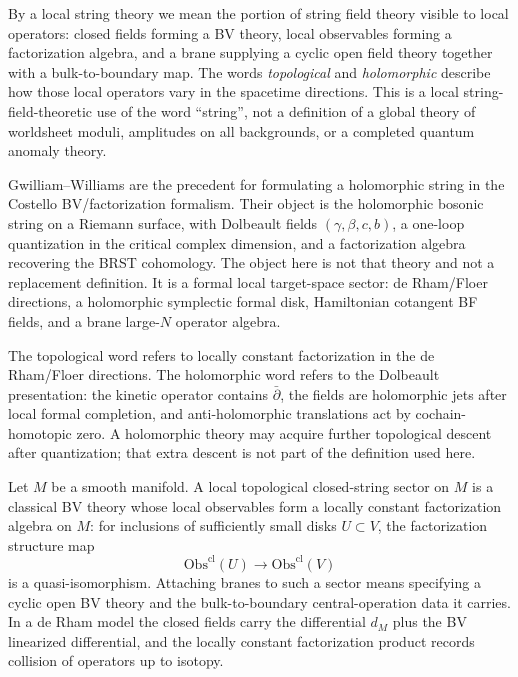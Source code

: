\documentclass[11pt]{memoir}
\begin{document}
By a local string theory we mean the portion of string field theory
visible to local operators: closed fields forming a BV theory, local
observables forming a factorization algebra, and a brane supplying a
cyclic open field theory together with a bulk-to-boundary map. The
words \emph{topological} and \emph{holomorphic} describe how those
local operators vary in the spacetime directions. This is a
local string-field-theoretic use of the word ``string'', not a
definition of a global theory of worldsheet moduli, amplitudes on
all backgrounds, or a completed quantum anomaly theory.

Gwilliam--Williams \cite{gwilliam-williams-holomorphic-bosonic-string} are
the precedent for formulating a holomorphic string in the Costello
BV/factorization formalism. Their object is the holomorphic bosonic string
on a Riemann surface, with Dolbeault fields $(\gamma,\beta,c,b)$, a
one-loop quantization in the critical complex dimension, and a
factorization algebra recovering the BRST cohomology. The object here is
not that theory and not a replacement definition. It is a formal local
target-space sector: de Rham/Floer directions, a holomorphic symplectic
formal disk, Hamiltonian cotangent BF fields, and a brane large-$N$
operator algebra.

The topological word refers to locally constant factorization in the de
Rham/Floer directions. The holomorphic word refers to the Dolbeault
presentation: the kinetic operator contains $\bar\partial$, the fields are
holomorphic jets after local formal completion, and anti-holomorphic
translations act by cochain-homotopic zero. A holomorphic theory may
acquire further topological descent after quantization; that extra descent
is not part of the definition used here.

\begin{defn}\label{def:local-topological-string-sector}
  Let $M$ be a smooth manifold. A local topological closed-string sector on
  $M$ is a classical BV theory whose local observables form a locally constant
  factorization algebra on $M$: for inclusions of sufficiently small disks
  $U\subset V$, the factorization structure map
  $$\mathrm{Obs}^{\mathrm{cl}}(U)\longrightarrow
    \mathrm{Obs}^{\mathrm{cl}}(V)$$
  is a quasi-isomorphism. Attaching branes to such a sector means
  specifying a cyclic open BV theory and the bulk-to-boundary
  central-operation data it carries. In a de Rham model the closed fields carry the
  differential $d_M$ plus the BV linearized differential, and the locally
  constant factorization product records collision of operators up to isotopy.
\end{defn}
\end{document}
